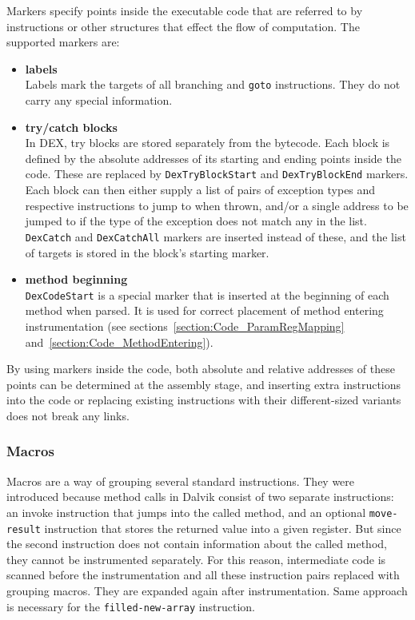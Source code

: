 \documentclass[12pt,twoside,notitlepage]{report}
\begin{document}
Markers specify points inside the executable code that are referred to by instructions or other structures that effect the flow of computation. The supported markers are:
\begin{itemize}
\item \textbf{labels} \\
Labels mark the targets of all branching and \verb$goto$ instructions. They do not carry any special information.
\item \textbf{try/catch blocks} \\
In DEX, try blocks are stored separately from the bytecode. Each block is defined by the absolute addresses of its starting and ending points inside the code. These are replaced by \verb$DexTryBlockStart$ and \verb$DexTryBlockEnd$ markers. Each block can then either supply a list of pairs of exception types and respective instructions to jump to when thrown, and/or a single address to be jumped to if the type of the exception does not match any in the list. \verb$DexCatch$ and \verb$DexCatchAll$ markers are inserted instead of these, and the list of targets is stored in the block's starting marker. 
\item \textbf{method beginning} \\
\verb$DexCodeStart$ is a special marker that is inserted at the beginning of each method when parsed. It is used for correct placement of method entering instrumentation (see sections~\ref{section:Code_ParamRegMapping} and~\ref{section:Code_MethodEntering}).

\end{itemize}

By using markers inside the code, both absolute and relative addresses of these points can be determined at the assembly stage, and inserting extra instructions into the code or replacing existing instructions with their different-sized variants does not break any links.

\subsubsection{Macros}
\label{section:Code_Macros}

Macros are a way of grouping several standard instructions. They were introduced because method calls in Dalvik consist of two separate instructions: an invoke instruction that jumps into the called method, and an optional \verb$move-result$ instruction that stores the returned value into a given register. But since the second instruction does not contain information about the called method, they cannot be instrumented separately. For this reason, intermediate code is scanned before the instrumentation and all these instruction pairs replaced with grouping macros. They are expanded again after instrumentation. Same approach is necessary for the \verb$filled-new-array$ instruction.
\end{document}
